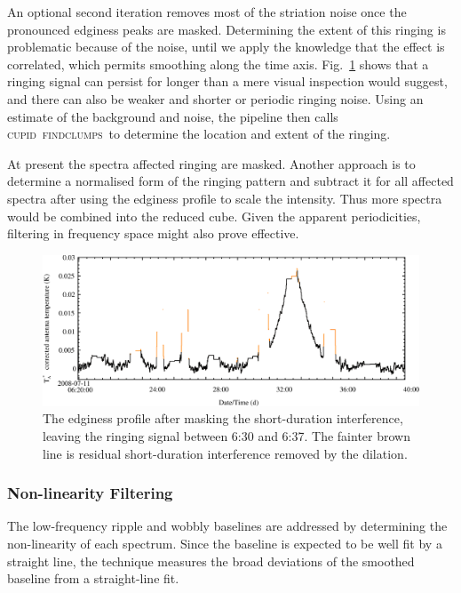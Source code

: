 \documentclass[a4paper,fleqn,usenatbib]{mnras}
\newcommand{\cupid}{\textsc{cupid}}
\newcommand{\findclumps}{\textsc{findclumps}}
\begin{document}
An optional second iteration removes most of the striation noise once
the pronounced edginess peaks are masked.  Determining the extent of
this ringing is problematic because of the noise, until we apply the
knowledge that the effect is correlated, which permits smoothing
along the time axis.
Fig.~\ref{fig:badbase:ringing_edginess_profile} shows that a ringing
signal can persist for longer than a mere visual inspection would
suggest, and there can also be weaker and shorter or periodic ringing
noise.  Using an estimate of the background and noise, the pipeline
then calls \cupid\ \findclumps\ to determine the location and extent
of the ringing.

At present the spectra affected ringing are masked.  Another approach
is to determine a normalised form of the ringing pattern and subtract
it for all affected spectra after using the edginess profile to scale
the intensity.  Thus more spectra would be combined into the reduced
cube.  Given the apparent periodicities, filtering in frequency
space might also prove effective.

\begin{figure}
\includegraphics[width=\textwidth]{ringing_edginess_profile}
\caption{The edginess profile after masking the short-duration
  interference, leaving the ringing signal between 6:30 and 6:37.
  The fainter brown line is residual short-duration interference
  removed by the dilation.}
\label{fig:badbase:ringing_edginess_profile}
\end{figure}


\subsubsection{Non-linearity Filtering}
\label{sec:non-linearity}

The low-frequency ripple and wobbly baselines are addressed by
determining the non-linearity of each spectrum.  Since the baseline
is expected to be well fit by a straight line, the technique
measures the broad deviations of the smoothed baseline from a
straight-line fit.
\end{document}

